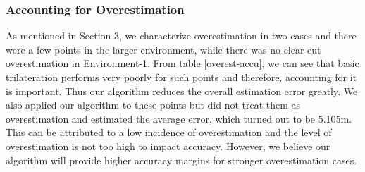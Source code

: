 \documentclass[twocolumn]{svjour3}
\begin{document}
\subsubsection{\textbf{Accounting for Overestimation}}

As mentioned in Section 3, we characterize overestimation in two cases and there were a few points in the larger environment, while there was no clear-cut overestimation in Environment-1. From table \ref{overest-accu}, we can see that basic trilateration performs very poorly for such points and therefore, accounting for it is important. Thus our algorithm reduces the overall estimation error greatly. We also applied our algorithm to these points but did not treat them as overestimation and estimated the average error, which turned out to be 5.105m. This can be attributed to a low incidence of overestimation and the level of overestimation is not too high to impact accuracy. However, we believe our algorithm will provide higher accuracy margins for stronger overestimation cases. 
\end{document}
